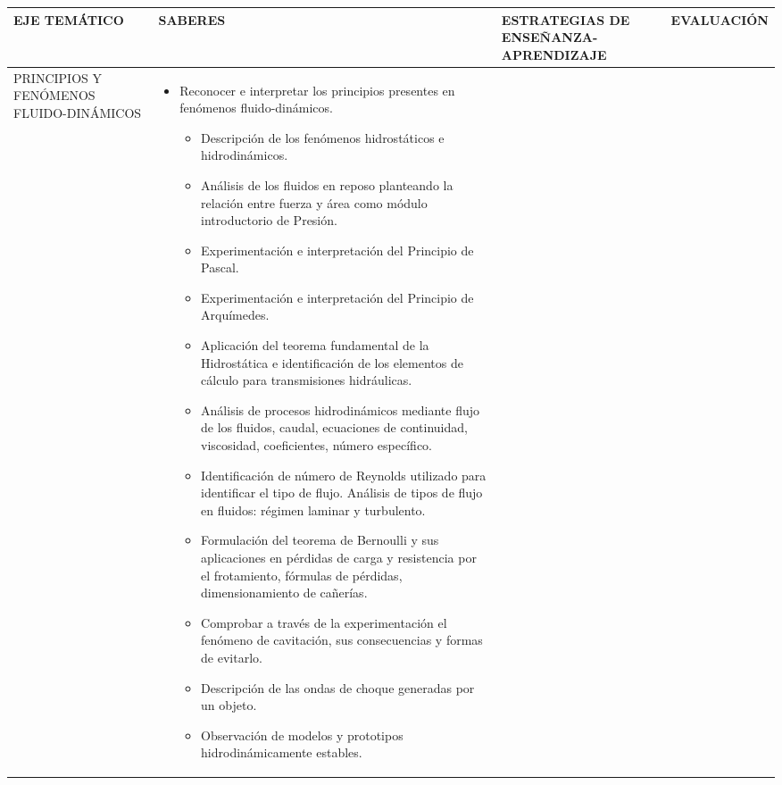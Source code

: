 \documentclass[planificacion.tex]{subfiles}
\begin{document}
  \begin{longtable}{|p{3cm}|p{13cm}|p{5cm}|p{5cm}|}  \hline
         {\centering EJE TEMÁTICO} &  {\centering SABERES} &  {\centering ESTRATEGIAS DE ENSEÑANZA-APRENDIZAJE} & {\centering EVALUACIÓN} \\ \hline   \endhead
         PRINCIPIOS Y FENÓMENOS FLUIDO-DINÁMICOS & 
         \begin{itemize}
        \item Reconocer e interpretar los
principios presentes en
fenómenos fluido-dinámicos.
        \begin{itemize}
            \item Descripción de los fenómenos hidrostáticos e
hidrodinámicos.
\item Análisis de los fluidos en reposo planteando la
relación entre fuerza y área como módulo introductorio
de Presión.
\item Experimentación e interpretación del Principio de
Pascal.
\item Experimentación e interpretación del Principio de
Arquímedes.
\item Aplicación del teorema fundamental de la Hidrostática
e identificación de los elementos de cálculo para
transmisiones hidráulicas.
\item Análisis de procesos hidrodinámicos mediante flujo de
los fluidos, caudal, ecuaciones de continuidad,
viscosidad, coeficientes, número específico.
\item Identificación de número de Reynolds utilizado para
identificar el tipo de flujo. 
Análisis de tipos de flujo en fluidos: régimen laminar y
turbulento.
\item Formulación del teorema de Bernoulli y sus
aplicaciones en pérdidas de carga y resistencia por el
frotamiento, fórmulas de pérdidas, dimensionamiento
de cañerías.
\item Comprobar a través de la experimentación el
fenómeno de cavitación, sus consecuencias y formas
de evitarlo.
\item Descripción de las ondas de choque generadas por un
objeto.
\item Observación de modelos y prototipos
hidrodinámicamente estables. 


\end{itemize}
\end{itemize}
\end{longtable}
\end{document}
